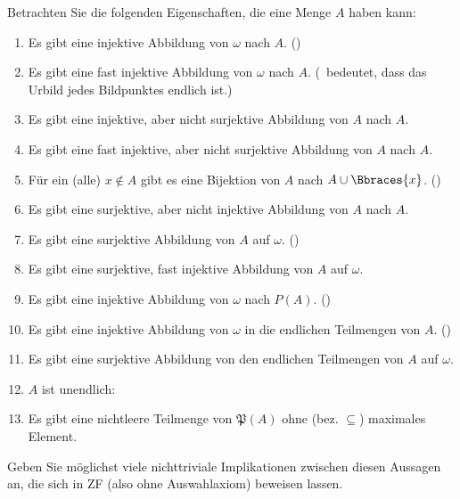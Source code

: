 
\begin{exercise}[272]

Betrachten Sie die folgenden Eigenschaften, die eine Menge $A$ haben kann:

\begin{enumerate}[label = \alph*.]
  \item Es gibt eine injektive Abbildung von $\omega$ nach $A$. ()
  \item Es gibt eine fast injektive Abbildung von $\omega$ nach $A$.
  (\ bedeutet, dass das Urbild jedes Bildpunktes endlich ist.)
  \item Es gibt eine injektive, aber nicht surjektive Abbildung von $A$ nach $A$.
  \item Es gibt eine fast injektive, aber nicht surjektive Abbildung von $A$ nach $A$.
  \item Für ein (alle) $x \notin A$ gibt es eine Bijektion von $A$ nach $A \cup \Bbraces{x}$.
  ()
  \item Es gibt eine surjektive, aber nicht injektive Abbildung von $A$ nach $A$.
  \item Es gibt eine surjektive Abbildung von $A$ auf $\omega$. ()
  \item Es gibt eine surjektive, fast injektive Abbildung von $A$ auf $\omega$.
  \item Es gibt eine injektive Abbildung von $\omega$ nach $P(A)$. ()
  \item Es gibt eine injektive Abbildung von $\omega$ in die endlichen Teilmengen von $A$. ()
  \item Es gibt eine surjektive Abbildung von den endlichen Teilmengen von $A$ auf $\omega$.
  \item $A$ ist unendlich: 
  \item Es gibt eine nichtleere Teilmenge von $\mathfrak{P}(A)$ ohne (bez. $\subseteq$) maximales Element.
\end{enumerate}

Geben Sie möglichst viele nichttriviale Implikationen zwischen diesen Aussagen an, die sich in ZF (also ohne Auswahlaxiom) beweisen lassen.

\end{exercise}


